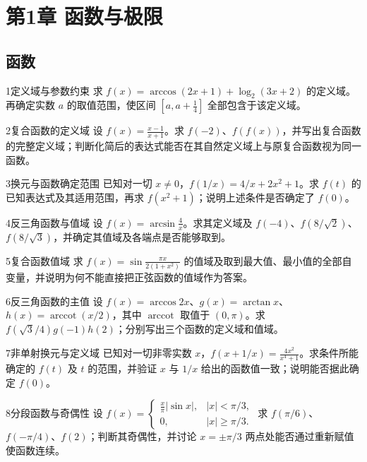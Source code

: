 \section{第1章 函数与极限}
\subsection{函数}
\begin{exercise}{1}{定义域与参数约束}
求 $f(x)=\arccos(2x+1)+\log_2(3x+2)$ 的定义域。再确定实数 $a$ 的取值范围，使区间 $[a,a+\frac14]$ 全部包含于该定义域。
\end{exercise}
\begin{exercise}{2}{复合函数的定义域}
设 $f(x)=\frac{x-1}{x+1}$。求 $f(-2)$、$f(f(x))$，并写出复合函数的完整定义域；判断化简后的表达式能否在其自然定义域上与原复合函数视为同一函数。
\end{exercise}
\begin{exercise}{3}{换元与函数确定范围}
已知对一切 $x\ne0$，$f(1/x)=4/x+2x^2+1$。求 $f(t)$ 的已知表达式及其适用范围，再求 $f(x^2+1)$；说明上述条件是否确定了 $f(0)$。
\end{exercise}
\begin{exercise}{4}{反三角函数与值域}
设 $f(x)=\arcsin\frac4x$。求其定义域及 $f(-4)$、$f(8/\sqrt2)$、$f(8/\sqrt3)$，并确定其值域及各端点是否能够取到。
\end{exercise}
\begin{exercise}{5}{复合函数值域}
求 $f(x)=\sin\frac{\pi x}{2(1+x^2)}$ 的值域及取到最大值、最小值的全部自变量，并说明为何不能直接把正弦函数的值域作为答案。
\end{exercise}
\begin{exercise}{6}{反三角函数的主值}
设 $f(x)=\arccos2x$、$g(x)=\arctan x$、$h(x)=\operatorname{arccot}(x/2)$，其中 $\operatorname{arccot}$ 取值于 $(0,\pi)$。求 $f(\sqrt3/4)g(-1)h(2)$；分别写出三个函数的定义域和值域。
\end{exercise}
\begin{exercise}{7}{非单射换元与定义域}
已知对一切非零实数 $x$，$f(x+1/x)=\frac{4x^2}{x^4+1}$。求条件所能确定的 $f(t)$ 及 $t$ 的范围，并验证 $x$ 与 $1/x$ 给出的函数值一致；说明能否据此确定 $f(0)$。
\end{exercise}
\begin{exercise}{8}{分段函数与奇偶性}
设 $f(x)=\begin{cases}\frac{x}{\pi}|\sin x|,&|x|<\pi/3,\\0,&|x|\ge\pi/3.\end{cases}$ 求 $f(\pi/6)$、$f(-\pi/4)$、$f(2)$；判断其奇偶性，并讨论 $x=\pm\pi/3$ 两点处能否通过重新赋值使函数连续。
\end{exercise}
